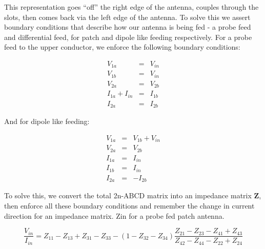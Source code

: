 \documentclass{article}
\begin{document}
This representation goes “off” the right edge of the antenna, couples through the slots, then comes back via the left edge of the antenna. To solve this we assert boundary conditions that describe how our antenna is being fed -  a probe feed and differential feed, for patch and dipole like feeding respectively. For a probe feed to the upper conductor, we enforce the following boundary conditions:

\begin{eqnarray}
	V_{1a} &=& V_{in}\\
	V_{1b} &=& V_{in}\\
	V_{2a}&=&V_{2b}\\
	I_{1a} + I_{in} &= &I_{1b}\\
	I_{2a} &=& I_{2b}
\end{eqnarray}

And for dipole like feeding:

\begin{eqnarray}
	V_{1a} &=& V_{1b}+V_{in}\\
	V_{2a}&=&V_{2b}\\
	I_{1a} &= &I_{in}\\
	I_{1b} &=& I_{in}\\
	I_{2a} &=& -I_{2b}
\end{eqnarray}

To solve this, we convert the total 2n-ABCD matrix into an impedance matrix $\mathbf{Z}$, then enforce all these boundary conditions and remember the change in current direction for an impedance matrix. Zin for a probe fed patch antenna. 

\begin{equation}
	\frac{V_{in}}{I_{in}} = Z_{11}-Z_{13}+Z_{31}-Z_{33}-(1-Z_{32}-Z_{34})\frac{Z_{21}-Z_{23}-Z_{41}+Z_{43}}{Z_{42}-Z_{44}-Z_{22}+Z_{24}}

\end{equation}
\end{document}
